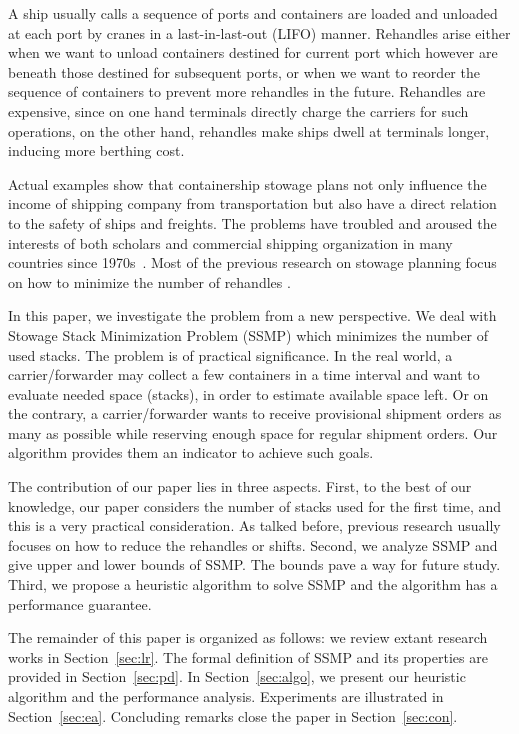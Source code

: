 \documentclass[review,3p,times,authoryear,12pt]{elsarticle}
\begin{document}
A ship usually calls a sequence of ports and containers are loaded and unloaded at each port by cranes in a last-in-last-out (LIFO) manner.
Rehandles arise either when we want to unload containers destined for current port which however are beneath those destined for subsequent ports, or when we want to reorder the sequence of containers to prevent more rehandles in the future.
Rehandles are expensive, since on one hand terminals directly charge the carriers for such operations, on the other hand, rehandles make ships dwell at terminals longer, inducing more berthing cost.

Actual examples show that containership stowage plans not only influence the income of shipping company from transportation but also have a direct relation to the safety of ships and freights.
The problems have troubled and aroused the interests of both scholars and commercial shipping organization in many countries since 1970s~\citep{webster1970container}.
Most of the previous research on stowage planning focus on how to minimize the number of rehandles \citep{ding2015stowage,zhang2016multiobjective,zehendner2017algorithm}.

In this paper, we investigate the problem from a new perspective. We deal with Stowage Stack Minimization Problem (SSMP) which minimizes the number of used stacks.
The problem is of practical significance. In the real world, a carrier/forwarder may collect a few containers in a time interval and want to evaluate needed space (stacks), in order to estimate available space left.
Or on the contrary, a carrier/forwarder wants to receive provisional shipment orders as many as possible while reserving enough space for regular shipment orders.
Our algorithm provides them an indicator to achieve such goals.

The contribution of our paper lies in three aspects.
First, to the best of our knowledge, our paper considers the number of stacks used for the first time, and this is a very practical consideration.
As talked before, previous research usually focuses on how to reduce the rehandles or shifts.
Second, we analyze SSMP and give upper and lower bounds of SSMP. The bounds pave a way for future study.
Third, we propose a heuristic algorithm to solve SSMP and the algorithm has a performance guarantee.

The remainder of this paper is organized as follows: we review extant research works in Section~\ref{sec:lr}. The formal definition of SSMP and its properties are provided in Section~\ref{sec:pd}.
In Section~\ref{sec:algo}, we present our heuristic algorithm and the performance analysis.
Experiments are illustrated in Section~\ref{sec:ea}. Concluding remarks close the paper in Section~\ref{sec:con}.
\end{document}
